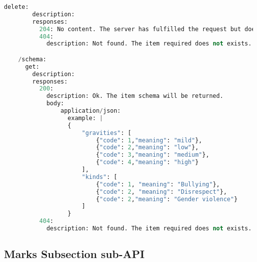 \begin{lstlisting}[language=python,frame=none]
      delete:
        description:
        responses:
          204: No content. The server has fulfilled the request but does not need to return an entity-body.
          404:
            description: Not found. The item required does not exists.

    /schema:
      get:
        description:
        responses:
          200:
            description: Ok. The item schema will be returned.
            body:
                application/json:
                  example: |
                  {
                      "gravities": [
                          {"code": 1,"meaning": "mild"},
                          {"code": 2,"meaning": "low"},
                          {"code": 3,"meaning": "medium"},
                          {"code": 4,"meaning": "high"}
                      ],
                      "kinds": [
                          {"code": 1, "meaning": "Bullying"},
                          {"code": 2, "meaning": "Disrespect"},
                          {"code": 2,"meaning": "Gender violence"}
                      ]
                  }
          404:
            description: Not found. The item required does not exists.

\end{lstlisting}

\subsection{Marks Subsection sub-API}

